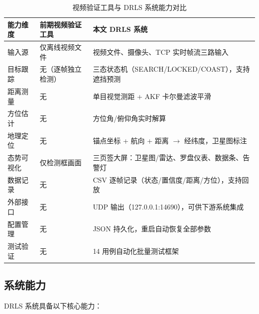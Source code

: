 \documentclass[12pt, a4paper]{ctexart}
\begin{document}
\begin{table}[H]
\centering
\caption{视频验证工具与 DRLS 系统能力对比}
\label{tab:compare_old_new}
\small
\begin{tabular}{p{3cm}p{4.5cm}p{6cm}}
\toprule
\textbf{能力维度} & \textbf{前期视频验证工具} & \textbf{本文 DRLS 系统} \\
\midrule
输入源 & 仅离线视频文件 & 视频文件、摄像头、TCP 实时帧流三路输入 \\
目标跟踪 & 无（逐帧独立检测） & 三态状态机（SEARCH/LOCKED/COAST），支持遮挡预测 \\
距离测量 & 无 & 单目视觉测距 + AKF 卡尔曼滤波平滑 \\
方位估计 & 无 & 方位角/俯仰角实时解算 \\
地理定位 & 无 & 锚点坐标 + 航向 + 距离 $\rightarrow$ 经纬度，卫星图标注 \\
态势可视化 & 仅检测框画面 & 三页签大屏：卫星图/雷达、罗盘仪表、数据条、告警灯 \\
数据记录 & 无 & CSV 逐帧记录（状态/置信度/距离/方位），支持回放 \\
外部接口 & 无 & UDP 输出（127.0.0.1:14690），可供下游系统集成 \\
配置管理 & 无 & JSON 持久化，重启自动恢复全部参数 \\
测试验证 & 无 & 14 用例自动化批量测试框架 \\
\bottomrule
\end{tabular}
\end{table}

\subsection{系统能力}

DRLS 系统具备以下核心能力：
\end{document}
